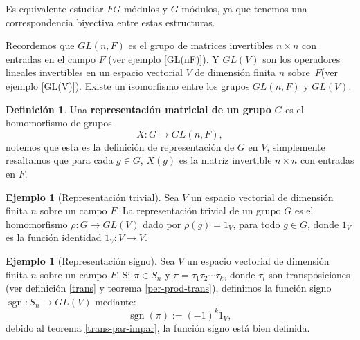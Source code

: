\documentclass[12pt]{book}
\theoremstyle{definition}
\newtheorem{definition}[theorem]{Definición}
\newtheorem{example}[theorem]{Ejemplo}
\DeclareMathOperator{\sgn}{sgn}
\newcounter{in}
\newcounter{ini}
\begin{document}
Es equivalente estudiar $FG$-módulos y $G$-módulos, ya que tenemos una
correspondencia biyectiva entre estas estructuras.

Recordemos que $GL(n,F)$ es el grupo de matrices invertibles $n\times
n$ con entradas en el campo $F$ (ver ejemplo \ref{GL(nF)}). Y $GL(V)$ son los operadores lineales
invertibles en un espacio vectorial $V$ de dimensión finita $n$ sobre~$F$(ver ejemplo \ref{GL(V)}). Existe un isomorfismo entre los grupos
$GL(n,F)$ y $GL(V)$.

\begin{definition}
  Una \textbf{representación matricial de un grupo} $G$ es el
  homomorfismo de grupos 
  $$X:G\rightarrow GL(n,F),$$
  notemos que esta es la definición de representación de $G$ en $V$, simplemente resaltamos que para cada $g\in G$, $X(g)$  es la
  matriz invertible $n \times n$ con entradas en $F$.
\end{definition}


\begin{example}[Representación trivial]
  Sea $V$ un espacio vectorial de dimensión finita $n$ sobre un campo $F$.
  La representación trivial de un grupo $G$ es el homomorfismo
  $\rho:G\rightarrow GL(V)$ dado por
  $\rho(g)=1_{V}$, para todo $g\in G$, donde $1_{V}$
  es la función identidad $1_{V}:V\rightarrow V$. 
\end{example}

\begin{example}[Representación signo]
  Sea $V$ un espacio vectorial de dimensión finita $n$ sobre un campo $F$.
  Si $\pi\in S_{n}$ y $\pi=\tau_{1}\tau_{2}\cdots\tau_{k}$, donde $\tau_{i}$ son
  transposiciones (ver definición \ref{trans} y teorema \ref{per-prod-trans}), definimos la función
  signo $\sgn:S_{n} \rightarrow GL(V)$
  mediante: $$\sgn(\pi):=(-1)^{k}1_{V},$$
  debido al teorema \ref{trans-par-impar}, la función signo está bien definida.
\end{example}
\end{document}
